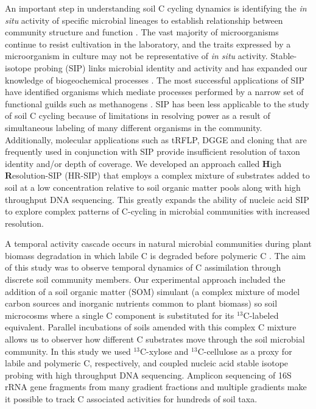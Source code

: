 An important step in understanding soil C cycling dynamics is identifying the
\textit{in situ} activity of specific microbial lineages to establish
relationship between community structure and function \citep{O_Donnell_2002}.
The vast majority of microorganisms continue to resist cultivation in the
laboratory, and the traits expressed by a microorganism in culture may not be
representative of \textit{in situ} activity. Stable-isotope probing (SIP) links
microbial identity and activity and has expanded our knowledge of
biogeochemical processes \citep{Chen_Murrell_2010}. The most successful
applications of SIP have identified organisms which mediate processes performed
by a narrow set of functional guilds such as methanogens \citep{Lu_2005}. SIP
has been less applicable to the study of soil C cycling because of limitations
in resolving power as a result of simultaneous labeling of many different
organisms in the community. Additionally, molecular applications such as tRFLP,
DGGE and cloning that are frequently used in conjunction with SIP provide
insufficient resolution of taxon identity and/or depth of coverage. We 
developed an approach called \textbf{H}igh \textbf{R}esolution-SIP (HR-SIP)
that employs a complex mixture of substrates added to soil at a low
concentration relative to soil organic matter pools along with high throughput
DNA sequencing. This greatly expands the ability of nucleic acid SIP to explore
complex patterns of C-cycling in microbial communities with increased
resolution.

A temporal activity cascade occurs in natural microbial communities during
plant biomass degradation in which labile C is degraded before polymeric
C \citep{Hu_1997,Rui_2009}.  The aim of this study was to observe temporal
dynamics of C assimilation through discrete soil community members. Our
experimental approach included the addition of a soil organic matter (SOM)
simulant (a complex mixture of model carbon sources and inorganic nutrients
common to plant biomass) so soil microcosms where a single C component is
substituted for its $^{13}$C-labeled equivalent. Parallel incubations of soils
amended with this complex C mixture allows us to observer how different
C substrates move through the soil microbial community. In this study we used
$^{13}$C-xylose and $^{13}$C-cellulose as a proxy for labile and polymeric C,
respectively, and coupled nucleic acid stable isotope probing with high
throughput DNA sequencing. Amplicon sequencing of 16S rRNA
gene fragments from many gradient fractions and multiple gradients make it
possible to track C associated activities for hundreds of soil taxa.
